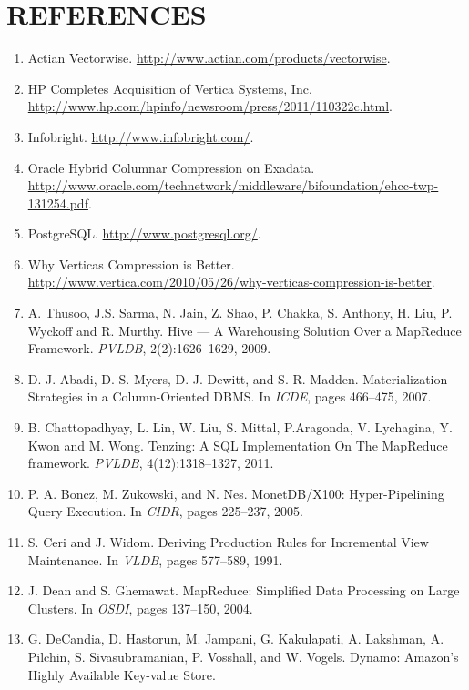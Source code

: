 \documentclass[a4paper,12pt,notitlepage,twoside,openright]{article}
\begin{document}
\hypertarget{references}{%
\section{REFERENCES}\label{references}}

\begin{enumerate}
\def\labelenumi{\arabic{enumi}.}
\item
  Actian Vectorwise. \url{http://www.actian.com/products/vectorwise}.
\item
  HP Completes Acquisition of Vertica Systems, Inc.
  \url{http://www.hp.com/hpinfo/newsroom/press/2011/110322c.html}.
\item
  Infobright. \url{http://www.infobright.com/}.
\item
  Oracle Hybrid Columnar Compression on Exadata.
  \url{http://www.oracle.com/technetwork/middleware/bifoundation/ehcc-twp-131254.pdf}.
\item
  PostgreSQL. \url{http://www.postgresql.org/}.
\item Why Verticas Compression is Better. \url{http://www.vertica.com/2010/05/26/why-verticas-compression-is-better}.
\item
  A. Thusoo, J.S. Sarma, N. Jain, Z. Shao, P. Chakka,
  S. Anthony, H. Liu, P. Wyckoff and R. Murthy. Hive --- A Warehousing
  Solution Over a MapReduce Framework. \emph{PVLDB}, 2(2):1626--1629,
  2009.
\item
  D. J. Abadi, D. S. Myers, D. J. Dewitt, and S. R. Madden.
  Materialization Strategies in a Column-Oriented DBMS. In \emph{ICDE},
  pages 466--475, 2007.
\item
  B. Chattopadhyay, L. Lin, W. Liu, S. Mittal, P.Aragonda, V. Lychagina,
  Y. Kwon and M. Wong. Tenzing: A SQL Implementation On The MapReduce
  framework. \emph{PVLDB}, 4(12):1318--1327, 2011.
\item
  P. A. Boncz, M. Zukowski, and N. Nes.
  MonetDB/X100: Hyper-Pipelining Query Execution. In \emph{CIDR}, pages
  225--237, 2005.
\item
  S. Ceri and J. Widom. Deriving Production Rules for
  Incremental View Maintenance. In \emph{VLDB}, pages 577--589, 1991.
\item
  J. Dean and S. Ghemawat. MapReduce: Simplified Data Processing on
  Large Clusters. In \emph{OSDI}, pages 137--150, 2004.
\item
  G. DeCandia, D. Hastorun, M. Jampani,
  G. Kakulapati, A. Lakshman, A. Pilchin,
  S. Sivasubramanian, P. Vosshall, and W. Vogels.
  Dynamo: Amazon's Highly Available Key-value Store.

\end{enumerate}
\end{document}
